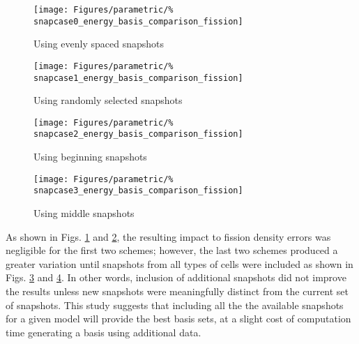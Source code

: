 \begin{figure*}[tb]
    \centering
    \begin{subfigure}{0.5\textwidth}
        \centering
        \texttt{[image: Figures/parametric/\%
            snapcase0\_energy\_basis\_comparison\_fission]}
        \caption{Using evenly spaced snapshots}
        \label{fig:snapcase0}
    \end{subfigure}%
    \begin{subfigure}{0.5\textwidth}
        \centering
        \texttt{[image: Figures/parametric/\%
            snapcase1\_energy\_basis\_comparison\_fission]}
        \caption{Using randomly selected snapshots}
        \label{fig:snapcase1}
    \end{subfigure}%
    
    \vspace{0.15cm}
    \begin{subfigure}{0.5\textwidth}
        \centering
        \texttt{[image: Figures/parametric/\%
            snapcase2\_energy\_basis\_comparison\_fission]}
        \caption{Using beginning snapshots}
        \label{fig:snapcase2}
    \end{subfigure}%
    \begin{subfigure}{0.5\textwidth}
        \centering
        \texttt{[image: Figures/parametric/\%
            snapcase3\_energy\_basis\_comparison\_fission]}
        \caption{Using middle snapshots}
        \label{fig:snapcase3}
    \end{subfigure}%
    \caption{Relative error for 238-group, BWR test problem when using various 
snapshot selection schemes.  The schemes converge as the number of snapshots 
increases. The legend numbers correspond to the number of snapshots selected 
for KLT basis generation.}
\end{figure*}

As shown in Figs. \ref{fig:snapcase0} and \ref{fig:snapcase1}, the resulting 
impact to fission density errors was negligible for the first two 
schemes; however, the last two schemes produced a greater variation until 
snapshots from all types of cells were included as shown in Figs. 
\ref{fig:snapcase2} and \ref{fig:snapcase3}.  In other words, inclusion of 
additional snapshots did not improve the results unless 
new snapshots were meaningfully distinct from the current set of snapshots.  
This study suggests that including all the the available snapshots for a given 
model will provide the best basis sets, at a slight cost of computation time 
generating a basis using additional data.

